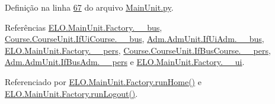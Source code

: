 Definição na linha \hyperlink{MainUnit_8py_source_l00067}{67} do arquivo \hyperlink{MainUnit_8py_source}{Main\+Unit.\+py}.



Referências \hyperlink{MainUnit_8py_source_l00044}{E\+L\+O.\+Main\+Unit.\+Factory.\+\_\+\+\_\+bus}, \hyperlink{CourseUnit_8py_source_l00055}{Course.\+Course\+Unit.\+If\+Ui\+Course.\+\_\+\+\_\+bus}, \hyperlink{AdmUnit_8py_source_l00067}{Adm.\+Adm\+Unit.\+If\+Ui\+Adm.\+\_\+\+\_\+bus}, \hyperlink{MainUnit_8py_source_l00045}{E\+L\+O.\+Main\+Unit.\+Factory.\+\_\+\+\_\+pers}, \hyperlink{CourseUnit_8py_source_l00099}{Course.\+Course\+Unit.\+If\+Bus\+Course.\+\_\+\+\_\+pers}, \hyperlink{AdmUnit_8py_source_l00112}{Adm.\+Adm\+Unit.\+If\+Bus\+Adm.\+\_\+\+\_\+pers} e \hyperlink{MainUnit_8py_source_l00043}{E\+L\+O.\+Main\+Unit.\+Factory.\+\_\+\+\_\+ui}.



Referenciado por \hyperlink{classELO_1_1MainUnit_1_1Factory_abb90458d8f89dd0fbfefcab94e9f023f}{E\+L\+O.\+Main\+Unit.\+Factory.\+run\+Home()} e \hyperlink{classELO_1_1MainUnit_1_1Factory_a3cf09225adad89e9802b3df03f39f86b}{E\+L\+O.\+Main\+Unit.\+Factory.\+run\+Logout()}.



